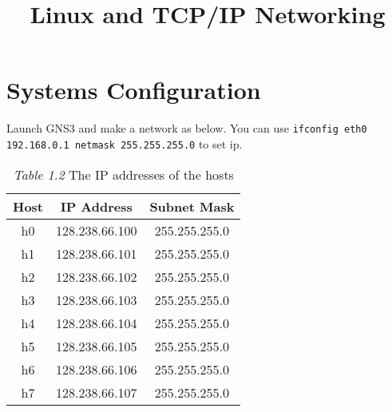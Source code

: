 \documentclass{../UTNetLab}
\title{Linux and TCP/IP Networking}
\begin{document}
\section*{Systems Configuration}
    Launch GNS3 and make a network as below. You can use \lstinline{ifconfig eth0 192.168.0.1 netmask 255.255.255.0} to set ip.
    \begin{center}
        \begin{minipage}{0.48\textwidth}
            \begin{flushleft}
                \begin{table}[H]
                    \caption{\textit{Table 1.2} The IP addresses of the hosts}
                    \centering
                    \begin{tabular}{ c c c }
                        \hline \hline
                        Host & IP Address & Subnet Mask \\
                        \hline 
                        h0 & 128.238.66.100 & 255.255.255.0 \\
                        h1 & 128.238.66.101 & 255.255.255.0 \\
                        h2 & 128.238.66.102 & 255.255.255.0 \\
                        h3 & 128.238.66.103 & 255.255.255.0 \\
                        h4 & 128.238.66.104 & 255.255.255.0 \\
                        h5 & 128.238.66.105 & 255.255.255.0 \\
                        h6 & 128.238.66.106 & 255.255.255.0 \\
                        h7 & 128.238.66.107 & 255.255.255.0 \\
                        \hline \hline
                        \end{tabular}
                \end{table}
            \end{flushleft}
        \end{minipage}
        \begin{minipage}{0.48\textwidth}
            \begin{flushright}
                \begin{figure}[H]
                    \centering
\end{figure}
\end{flushright}
\end{minipage}
\end{center}
\end{document}
